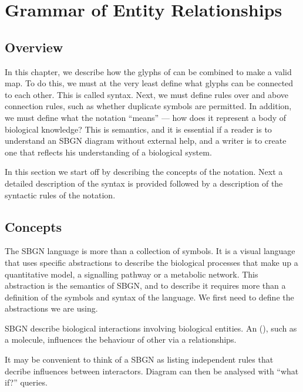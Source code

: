 \chapter{Grammar of Entity Relationships}
\label{chp:grammar}

\section{Overview}

In this chapter, we describe how the glyphs of \SBGNERLone can be combined
to make a valid \ER{} map. To do this, we must at the very least
define what glyphs can be connected to each other. This is called
syntax. Next, we must define rules over and above connection rules,
such as whether duplicate symbols are permitted. In addition, we must define what the notation ``means'' --- how does it represent a body of biological knowledge? This is semantics, and it is essential if a reader is to understand an SBGN diagram without external help, and a writer is to create one that reflects his understanding of a biological system.

In this section we start off by describing the concepts of the
\ER{} notation. Next a detailed description of the syntax is provided
followed by a description of the syntactic rules of the notation.

\section{Concepts}

The SBGN \ER{} language is more than a collection of symbols. It is a
visual language that uses specific abstractions to describe the
biological processes that make up a quantitative model, a signalling pathway or a metabolic network. This abstraction is the semantics of SBGN, and to describe it requires more than a definition
of the symbols and syntax of the language. We first need to define the
abstractions we are using.

SBGN \ERs{} describe biological interactions involving biological entities. An  (), such as a molecule, influences the behaviour of other  via a relationships. 

It may be convenient to think of a SBGN \ERs{} as listing independent rules that decribe influences between interactors. Diagram can then be analysed with ``what if?'' queries. 




